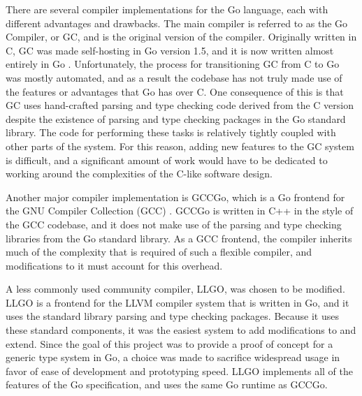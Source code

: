\documentclass[letterpaper,11pt]{article}
\begin{document}
There are several compiler implementations for the Go language, each with different advantages and drawbacks. The main compiler is referred to as the Go Compiler, or GC, and is the original version of the compiler. Originally written in C, GC was made self-hosting in Go version 1.5, and it is now written almost entirely in Go \cite{goselfhost}. Unfortunately, the process for transitioning GC from C to Go was mostly automated, and as a result the codebase has not truly made use of the features or advantages that Go has over C. One consequence of this is that GC uses hand-crafted parsing and type checking code derived from the C version despite the existence of parsing and type checking packages in the Go standard library. The code for performing these tasks is relatively tightly coupled with other parts of the system. For this reason, adding new features to the GC system is difficult, and a significant amount of work would have to be dedicated to working around the complexities of the C-like software design.

 Another major compiler implementation is GCCGo, which is a Go frontend for the GNU Compiler Collection (GCC) \cite{gcc}. GCCGo is written in C++ in the style of the GCC codebase, and it does not make use of the parsing and type checking libraries from the Go standard library. As a GCC frontend, the compiler inherits much of the complexity that is required of such a flexible compiler, and modifications to it must account for this overhead.

A less commonly used community compiler, LLGO, was chosen to be modified. LLGO is a frontend for the LLVM compiler system \cite{llvm} that is written in Go, and it uses the standard library parsing and type checking packages. Because it uses these standard components, it was the easiest system to add modifications to and extend. Since the goal of this project was to provide a proof of concept for a generic type system in Go, a choice was made to sacrifice widespread usage in favor of ease of development and prototyping speed. LLGO implements all of the features of the Go specification, and uses the same Go runtime as GCCGo.
\end{document}
